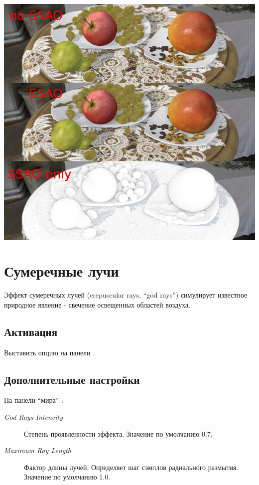 \documentclass[a4paper,12pt,oneside]{sphinxmanual}
\begin{document}
{\hfill\includegraphics[width=1.000\linewidth]{ssao.jpg}\hfill}

\begin{DUlineblock}{0em}
\item[] 
\end{DUlineblock}


\section{Сумеречные лучи}
\label{postprocessing_effects:god-rays}\label{postprocessing_effects:id11}\label{postprocessing_effects:index-3}
Эффект сумеречных лучей (crepuscular rays, ``god rays'') симулирует известное природное явление - свечение освещенных областей воздуха.


\subsection{Активация}
\label{postprocessing_effects:id12}
Выставить опцию  на панели .


\subsection{Дополнительные настройки}
\label{postprocessing_effects:id13}
На панели ``мира'' :
\begin{description}
\item[{\emph{God Rays Intencity}}] \leavevmode
Степень проявленности эффекта. Значение по умолчанию 0.7.

\item[{\emph{Maximum Ray Length}}] \leavevmode
Фактор длины лучей. Определяет шаг сэмплов радиального размытия. Значение по умолчанию 1.0.

\end{description}
\end{document}
